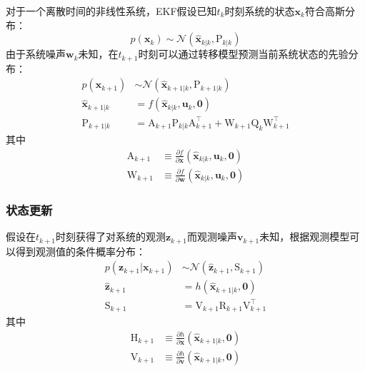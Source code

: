 对于一个离散时间的非线性系统，EKF假设已知$t_k$时刻系统的状态$\bm{x}_k$符合高斯分布：
\begin{equation}
    p(\bm{x}_k) \sim \mathcal{N}(\hat{\bm{x}}_{k|k},\mathrm{P}_{k|k})
\end{equation}
由于系统噪声$\bm{w}_k$未知，在$t_{k+1}$时刻可以通过转移模型预测当前系统状态的先验分布：
\begin{equation}
\begin{aligned}
    p(\bm{x}_{k+1}) &\sim \mathcal{N}(\hat{\bm{x}}_{k+1|k},\mathrm{P}_{k+1|k}) \\
    \hat{\bm{x}}_{k+1|k} &= f(\hat{\bm{x}}_{k|k},\bm{u}_k,\bm{0}) \\
    \mathrm{P}_{k+1|k}   &= \mathrm{A}_{k+1} \mathrm{P}_{k|k} \mathrm{A}_{k+1}^\top +
                            \mathrm{W}_{k+1} \mathrm{Q}_k\mathrm{W}_{k+1}^\top
\end{aligned}
\end{equation}
其中
\begin{equation}
\begin{aligned}
    \mathrm{A}_{k+1} &\equiv
        \frac{\partial f}
             {\partial\bm{x}}(\hat{\bm{x}}_{k|k},\bm{u}_k,\bm{0}) \\
    \mathrm{W}_{k+1} &\equiv
        \frac{\partial f}
             {\partial\bm{w}}(\hat{\bm{x}}_{k|k},\bm{u}_k,\bm{0})
\end{aligned}
\end{equation}

\subsubsection{状态更新}

假设在$t_{k+1}$时刻获得了对系统的观测$\bm{z}_{k+1}$而观测噪声$\bm{v}_{k+1}$未知，根据观测模型可以得到观测值的条件概率分布：
\begin{equation}
\begin{aligned}
    p(\bm{z}_{k+1}|\bm{x}_{k+1}) &\sim \mathcal{N}(\hat{\bm{z}}_{k+1}, \mathrm{S}_{k+1}) \\
    \hat{\bm{z}}_{k+1} &= h(\hat{\bm{x}}_{k+1|k},\bm{0}) \\
    \mathrm{S}_{k+1} &= \mathrm{V}_{k+1}\mathrm{R}_{k+1}\mathrm{V}_{k+1}^\top
\end{aligned}
\end{equation}
其中
\begin{equation}
\begin{aligned}
    \mathrm{H}_{k+1} &\equiv
        \frac{\partial h}
             {\partial\bm{x}}(\hat{\bm{x}}_{k+1|k},\bm{0}) \\
    \mathrm{V}_{k+1} &\equiv
        \frac{\partial h}
             {\partial\bm{v}}(\hat{\bm{x}}_{k+1|k},\bm{0})
\end{aligned}
\end{equation}

